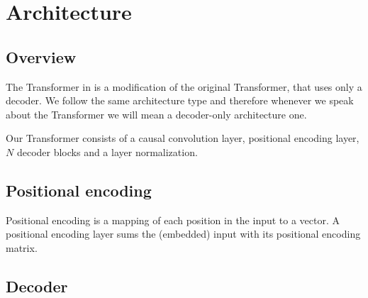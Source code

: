 \documentclass[en]{pracamgr}
\begin{document}
%


\section{Architecture}

\subsection{Overview}

The Transformer in \cite{enhancing} is a modification of the original Transformer\cite{tr}, that uses only a decoder.
We follow the same architecture type and therefore whenever we speak about the Transformer we will mean a decoder-only\cite{wikipedia} architecture one.

Our Transformer consists of a causal convolution layer, positional encoding layer, $N$ decoder blocks and a layer normalization.

\subsection{Positional encoding}

Positional encoding is a mapping of each position in the input to a vector.
A positional encoding layer sums the (embedded) input with its positional encoding matrix.

\subsection{Decoder}
\end{document}

